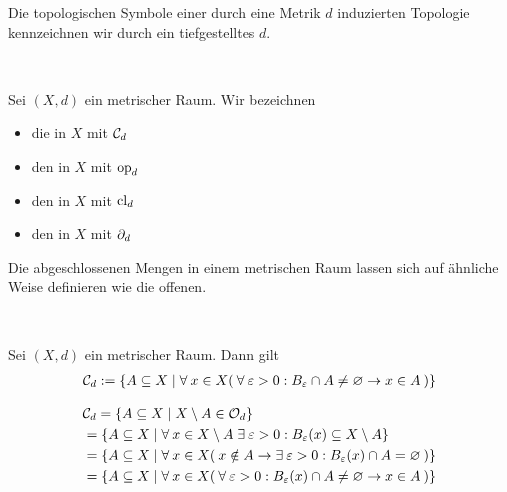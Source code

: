     Die topologischen Symbole einer durch eine Metrik $d$ induzierten Topologie kennzeichnen wir durch ein tiefgestelltes $d$.
    \begin{nota} \ \vspace{8pt}

        \noindent
        Sei $(X,d)$ ein metrischer Raum. Wir bezeichnen 
        \begin{itemize}
        \item die  in $X$ mit $\mathcal{C}_d$
        \item den  in $X$ mit $\text{op}_d$
        \item den  in $X$ mit $\text{cl}_d$
        \item den  in $X$ mit $\partial_d$
        \end{itemize}
    \end{nota}


    Die abgeschlossenen Mengen in einem metrischen Raum lassen sich auf ähnliche Weise definieren wie die offenen.
    \begin{satz} \label{satz:Cd} \ \hspace{8pt}

        \noindent
        Sei $(X,d)$ ein metrischer Raum. Dann gilt
        \begin{align*}
            \mathcal{C}_d := \{A \subseteq X \mid \forall\: x \in X (\: \forall\: \varepsilon > 0 : B_\varepsilon \cap A \neq \varnothing \rightarrow x \in A \:) \}
        \end{align*}
        
    \end{satz}
    \begin{bew}
        \begin{align*}
            &\mathcal{C}_d = \{A \subseteq X \mid X \setminus A \in \mathcal{O}_d\} \\
            &= \{A \subseteq X \mid \forall\: x \in X \setminus A \; \exists\: \varepsilon > 0 : B_\varepsilon(x) \subseteq X \setminus A\} \\
            &= \{A \subseteq X \mid \forall\: x \in X (\: x \notin A \rightarrow \exists\: \varepsilon > 0 : B_\varepsilon(x) \cap A = \varnothing \:) \} \\
            &= \{A \subseteq X \mid \forall\: x \in X (\: \forall\: \varepsilon > 0 : B_\varepsilon(x) \cap A \neq \varnothing \rightarrow x \in A \:) \} 
        \end{align*}
    \end{bew}


